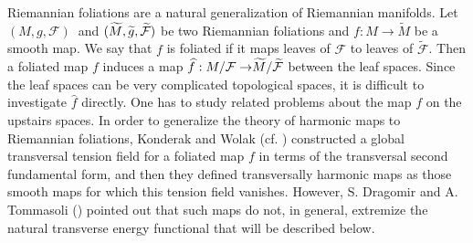 \documentclass[12pt,reqno]{amsart}
\theoremstyle{definition}
\begin{document}
	Riemannian foliations are a natural generalization of Riemannian manifolds.
	Let $(M,g,\mathcal{F})\ $ and $(\widetilde{M},\widetilde{g},\widetilde{%
	\mathcal{F}})$ be two Riemannian foliations and $f:M\rightarrow \widetilde{M}
	$ be a smooth map. We say that $f$ is foliated if it maps leaves of $%
	\mathcal{F}$ to leaves of $\widetilde{\mathcal{F}}$. Then a foliated map $f$
	induces a map $\widehat{f}:M/\mathcal{F\rightarrow }\widetilde{M}/\widetilde{%
	\mathcal{F}}$ between the leaf spaces. Since the leaf spaces can be very
	complicated topological spaces, it is difficult to investigate $\widehat{f}$
	directly. One has to study related problems about the map $f$ on the upstairs
	spaces. In order to generalize the theory of harmonic maps to Riemannian
	foliations, Konderak and Wolak (cf. \cite{konderakTransversallyHarmonicMaps2003,konderakREMARKSTRANSVERSALLYHARMONIC2008}) constructed a global
	transversal tension field for a foliated map $f$ in terms of the transversal
	second fundamental form, and then they defined transversally harmonic maps
	as those smooth maps for which this tension field vanishes. However, S.
	Dragomir and A. Tommasoli (\cite{dragomirHarmonicMapsFoliated2013a}) pointed out that such maps do not, in
	general, extremize the natural transverse energy functional that will be
	described below.
	
\end{document}
